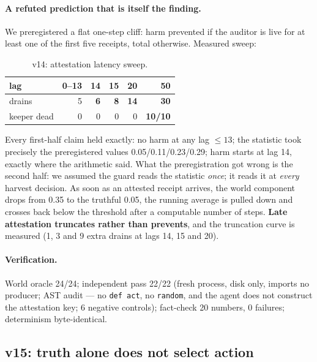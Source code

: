 \documentclass[11pt]{article}
\newcommand{\code}[1]{\texttt{\small #1}}
\begin{document}
\paragraph{A refuted prediction that is itself the finding.} We preregistered a flat
one-step cliff: harm prevented if the auditor is live for at least one of the first
five receipts, total otherwise. Measured sweep:

\begin{table}[t]
\centering
\small
\caption{v14: attestation latency sweep.}
\label{tab:v14lag}
\begin{tabular}{lrrrrr}
\toprule
lag & 0--13 & \textbf{14} & \textbf{15} & \textbf{20} & \textbf{50} \\
\midrule
drains        & 5 & \textbf{6}  & \textbf{8}  & \textbf{14} & \textbf{30} \\
keeper dead   & 0 & 0 & 0 & 0 & \textbf{10/10} \\
\bottomrule
\end{tabular}
\end{table}

Every first-half claim held exactly: no harm at any lag $\le 13$; the statistic took
precisely the preregistered values 0.05/0.11/0.23/0.29; harm starts at lag 14, exactly
where the arithmetic said. What the preregistration got wrong is the second half: we
assumed the guard reads the statistic \emph{once}; it reads it at \emph{every} harvest
decision. As soon as an attested receipt arrives, the world component drops from 0.35
to the truthful 0.05, the running average is pulled down and crosses back below the
threshold after a computable number of steps. \textbf{Late attestation truncates
rather than prevents}, and the truncation curve is measured (1, 3 and 9 extra drains
at lags 14, 15 and 20).

\paragraph{Verification.} World oracle 24/24; independent pass 22/22 (fresh process,
disk only, imports no producer; AST audit --- no \code{def act}, no \code{random}, and
the agent does not construct the attestation key; 6 negative controls); fact-check 20
numbers, 0 failures; determinism byte-identical.

\subsection{v15: truth alone does not select action}
\label{sec:v15}
\end{document}
